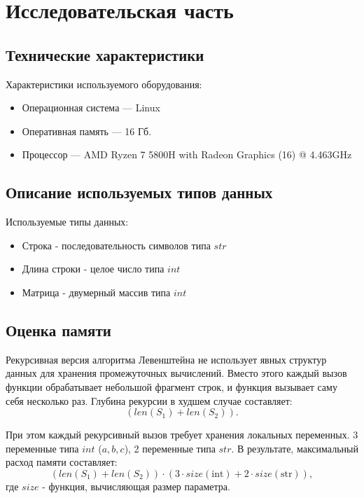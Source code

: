 \chapter{Исследовательская часть}

\section{Технические характеристики}
Характеристики используемого оборудования:
\begin{itemize}
    \item Операционная система --- Linux \cite{bib3}
    \item Оперативная память --- 16 Гб.
    \item Процессор --- AMD Ryzen 7 5800H with Radeon Graphics (16) @ 4.463GHz \cite{bib4}
\end{itemize}

\section{Описание используемых типов данных}
Используемые типы данных:
\begin{itemize}
	\item Строка - последовательность символов типа $str$
        \item Длина строки - целое число типа  $int$
        \item Матрица - двумерный массив типа $int$
\end{itemize}

\section{Оценка памяти}

Рекурсивная версия алгоритма Левенштейна не использует явных структур данных для хранения
промежуточных вычислений. Вместо этого каждый вызов функции обрабатывает небольшой
фрагмент строк, и функция вызывает саму себя несколько раз.
Глубина рекурсии в худшем случае составляет: 
\begin{equation}
	(len(S_{1}) + len(S_{2})).
\end{equation}


При этом каждый рекурсивный вызов требует хранения локальных переменных.
3 переменные типа $int$ ($a, b, c$), 2 переменные типа $str$. В результате,
максимальный расход памяти составляет:
\begin{equation}
	(len(S_{1}) + len(S_{2})) \cdot (3 \cdot size(\text{int}) + 2 \cdot size(\text{str})),
\end{equation}
где $size$ - функция, вычисляющая размер параметра.

